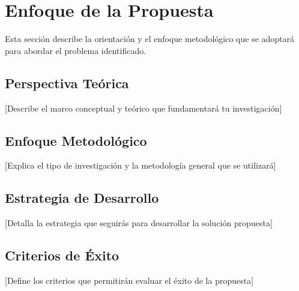 \section{Enfoque de la Propuesta}

Esta sección describe la orientación y el enfoque metodológico que se adoptará para abordar el problema identificado.

\subsection{Perspectiva Teórica}
[Describe el marco conceptual y teórico que fundamentará tu investigación]

\subsection{Enfoque Metodológico}
[Explica el tipo de investigación y la metodología general que se utilizará]

\subsection{Estrategia de Desarrollo}
[Detalla la estrategia que seguirás para desarrollar la solución propuesta]

\subsection{Criterios de Éxito}
[Define los criterios que permitirán evaluar el éxito de la propuesta]
